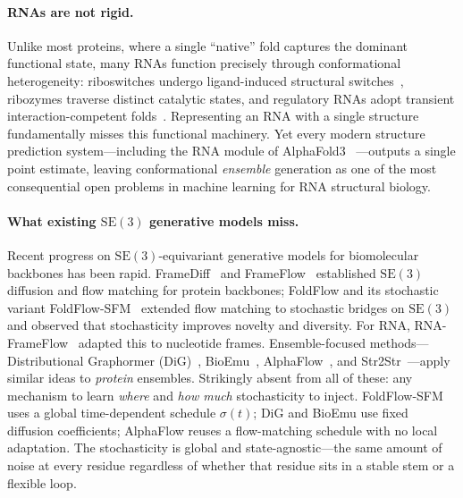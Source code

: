 \documentclass{article}
\theoremstyle{remark}
\theoremstyle{definition}
\newcommand{\SE}{\mathrm{SE}}
\begin{document}
\paragraph{RNAs are not rigid.}
Unlike most proteins, where a single ``native'' fold captures the dominant
functional state, many RNAs function precisely through conformational
heterogeneity: riboswitches undergo ligand-induced structural
switches~\citep{serganov2013decade}, ribozymes traverse distinct catalytic
states, and regulatory RNAs adopt transient interaction-competent
folds~\citep{mustoe2014hierarchy}. Representing an RNA with a single structure
fundamentally misses this functional machinery. Yet every modern structure
prediction system---including the RNA module of AlphaFold3~\citep{alphafold3}
---outputs a single point estimate, leaving conformational \emph{ensemble}
generation as one of the most consequential open problems in machine learning
for RNA structural biology.

\paragraph{What existing $\SE(3)$ generative models miss.}
Recent progress on $\SE(3)$-equivariant generative models for biomolecular
backbones has been rapid. FrameDiff~\citep{framediff} and
FrameFlow~\citep{frameflow} established $\SE(3)$ diffusion and flow matching
for protein backbones; FoldFlow and its stochastic variant
FoldFlow-SFM~\citep{foldflow} extended flow matching to stochastic bridges on
$\SE(3)$ and observed that stochasticity improves novelty and diversity. For
RNA, RNA-FrameFlow~\citep{rnaframeflow} adapted this to nucleotide frames.
Ensemble-focused methods---Distributional Graphormer (DiG)~\citep{dig},
BioEmu~\citep{bioemu}, AlphaFlow~\citep{alphaflow}, and
Str2Str~\citep{str2str}---apply similar ideas to \emph{protein} ensembles.
Strikingly absent from all of these: any mechanism to learn \emph{where} and
\emph{how much} stochasticity to inject. FoldFlow-SFM uses a global
time-dependent schedule $\sigma(t)$; DiG and BioEmu use fixed diffusion
coefficients; AlphaFlow reuses a flow-matching schedule with no local
adaptation. The stochasticity is global and state-agnostic---the same amount
of noise at every residue regardless of whether that residue sits in a stable
stem or a flexible loop.
\end{document}

